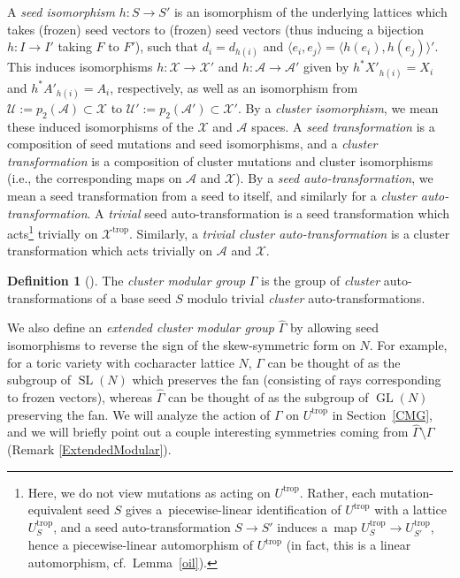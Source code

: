 \documentclass[11pt]{article}
\numberwithin{equation}{section}
\numberwithin{figure}{section}
\numberwithin{table}{section}
\DeclareMathOperator{\SL}{SL}
\DeclareMathOperator{\GL}{GL}
\DeclareMathOperator{\trop}{trop}
\let\rar=\rightarrow
\let\s=\mathcal
\let\wh=\widehat
\theoremstyle{definition}
\newtheorem{dfn}[thm]{Definition}
\begin{document}
A {\it seed isomorphism} $h\colon S\rar S'$ is an isomorphism of the underlying lattices which takes (frozen) seed vectors to (frozen) seed vectors (thus inducing a bijection $h\colon I\rar I'$ taking $F$ to $F'$), such that $d_i=d_{h(i)}$ and $\langle e_i,e_j\rangle = \langle h(e_i),h(e_j)\rangle'$. This induces isomorphisms $h\colon \s{X}\rar \s{X}'$ and $h\colon \s{A}\rar \s{A}'$ given by
	$h^{*}X'_{h(i)} = X_{i}$ and $h^{*}A'_{h(i)} = A_{i}$, respectively, as well as an isomorphism from $\s{U}:=p_2(\s{A})\subset \s{X}$ to $\s{U}':=p_2(\s{A}') \subset \s{X}'$. By a \textit{cluster isomorphism}, we mean these induced isomorphisms of the $\s{X}$ and $\s{A}$ spaces. A {\it seed transformation} is a composition of seed mutations and seed isomorphisms, and a {\it cluster transformation} is a composition of cluster mutations and cluster isomorphisms (i.e., the corresponding maps on $\s{A}$ and $\s{X}$). By a {\it seed auto-transformation}, we mean a seed transformation from a seed to itself, and similarly for a \textit{cluster auto-transformation}. A {\it trivial} seed auto-transformation is a seed transformation which acts\footnote{Here, we do not view mutations as acting on $U^{\trop}$. Rather, each mutation-equivalent seed $S$ gives a~piecewise-linear identification of $U^{\trop}$ with a lattice $U_S^{\trop}$, and a seed auto-transformation $S\rar S'$ induces a~map \mbox{$U_S^{\trop}\rar U_{S'}^{\trop}$}, hence a piecewise-linear automorphism of $U^{\trop}$ (in fact, this is a linear automorphism, cf.\ Lemma~\ref{oil}).} trivially on $\s{X}^{\trop}$. Similarly, a \textit{trivial cluster auto-transformation} is a cluster transformation which acts trivially on $\s{A}$ and $\s{X}$.
	
\begin{dfn}[\cite{FG1}]The {\it cluster modular group} $\Gamma$ is the group of {\it cluster} auto-transformations of a base seed $S$ modulo trivial {\it cluster} auto-transformations.
\end{dfn}

We also define an {\it extended cluster modular group} $\wh{\Gamma}$ by allowing seed isomorphisms to reverse the sign of the skew-symmetric form on $N$. For example, for a toric variety with cocharacter lattice $N$, $\Gamma$ can be thought of as the subgroup of $\SL(N)$ which preserves the fan (consisting of rays corresponding to frozen vectors), whereas $\wh{\Gamma}$ can be thought of as the subgroup of $\GL(N)$ preserving the fan. We will analyze the action of $\Gamma$ on $U^{\trop}$ in Section~\ref{CMG}, and we will briefly point out a couple interesting symmetries coming from $\wh{\Gamma}\setminus \Gamma$ (Remark \ref{ExtendedModular}).
\end{document}
